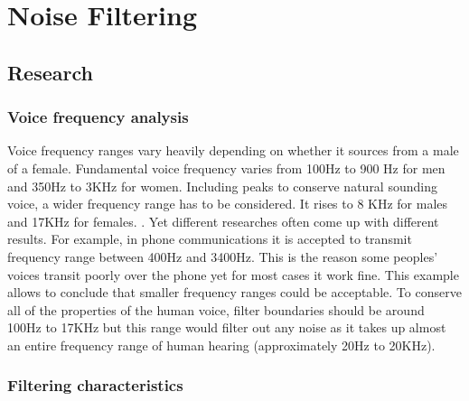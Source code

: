 \chapter{Noise Filtering}\label{NoiseFiltering}
\section{Research}
\subsection{Voice frequency analysis}
Voice frequency ranges vary heavily depending on whether it sources from a male of a female. Fundamental voice frequency varies from 100Hz to 900 Hz for men and 350Hz to 3KHz for women. Including peaks to conserve natural sounding voice, a wider frequency range has to be considered. It rises to 8 KHz for males and 17KHz for females. \cite{Seaindia}. Yet different researches often come up with different results. For example, in phone communications it is accepted to transmit frequency range between 400Hz and 3400Hz. This is the reason some peoples' voices transit poorly over the phone yet for most cases it work fine. This example allows to conclude that smaller frequency ranges could be acceptable. To conserve all of the properties of the human voice, filter boundaries should be around 100Hz to 17KHz but this range would filter out any noise as it takes up almost an entire frequency range of human hearing (approximately 20Hz to 20KHz).  
\subsection{Filtering characteristics}
